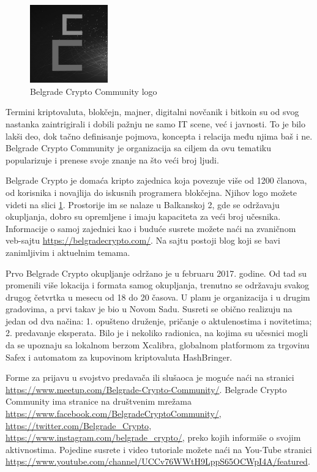 \documentclass[a4paper]{article}
\begin{document}
{\begin{figure}[h]
  \centering
  \includegraphics[width=0.3\textwidth]{bcc_logo.png}
  \caption{Belgrade Crypto Community logo}
  \label{fig:bgdcclogo}
\end{figure}

Termini  kriptovaluta, blokčejn, majner, digitalni novčanik i bitkoin su od svog nastanka zaintrigirali i dobili pažnju ne samo IT scene, već i javnosti. To je bilo lakši deo, dok tačno definisanje pojmova, koncepta i relacija među njima baš i ne. Belgrade Crypto Community je organizacija sa ciljem da ovu tematiku popularizuje i prenese svoje znanje na što veći broj ljudi.

Belgrade Crypto je domaća kripto zajednica koja povezuje više od 1200 članova, od korisnika i novajlija do iskusnih programera blokčejna. Njihov logo možete videti na slici \ref{fig:bgdcclogo}. Prostorije im se nalaze u Balkanskoj 2, gde se održavaju okupljanja, dobro su opremljene i imaju kapaciteta za veći broj učesnika. Informacije o samoj zajednici kao i buduće susrete možete naći na zvaničnom veb-sajtu \url{https://belgradecrypto.com/}. Na sajtu postoji blog koji se bavi zanimljivim i aktuelnim temama.

Prvo Belgrade Crypto okupljanje održano je u februaru 2017. godine. Od tad su promenili više lokacija i formata samog okupljanja, trenutno se održavaju svakog drugog četvrtka u mesecu od 18 do 20 časova. U planu je organizacija i u drugim gradovima, a prvi takav je bio u Novom Sadu. Susreti se obično realizuju na jedan od dva načina: 1. opušteno druženje, pričanje o aktulenostima i novitetima; 2. predavanje eksperata. Bilo je i nekoliko radionica, na kojima su učesnici mogli  da se upoznaju sa lokalnom berzom Xcalibra, globalnom platformom za trgovinu Safex i automatom za kupovinom kriptovaluta HashBringer. 

Forme za prijavu u svojstvo predavača ili slušaoca je moguće naći na stranici \url{https://www.meetup.com/Belgrade-Crypto-Community/}. Belgrade Crypto Community ima stranice na društvenim mrežama \url{https://www.facebook.com/BelgradeCryptoCommunity/}, \\ \url{https://twitter.com/Belgrade_Crypto}, \\ \url{https://www.instagram.com/belgrade_crypto/}, preko kojih informiše o svojim aktivnostima. Pojedine susrete i video tutoriale možete naći na You-Tube stranici \\ \url{https://www.youtube.com/channel/UCCv76WWtH9LppS65OCWpI4A/featured}.


}
\end{document}
